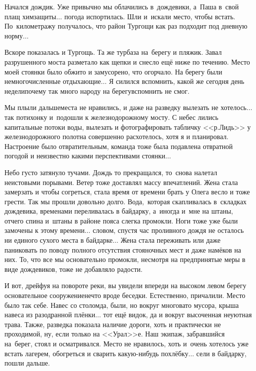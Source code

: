 Начался дождик. Уже привычно мы облачились в~дождевики, а~Паша в~свой плащ химзащиты$\ldots$ погода испортилась. Шли и~искали место, чтобы встать. По~километражу получалось, что район Тургощи как раз подходит под дневную норму$\ldots$

Вскоре показалась и Тургощь. Та же турбаза на~берегу и пляжик. Завал разрушенного моста разметало как щепки и снесло ещё ниже по течению. Место моей стоянки было обжито и замусорено, что огорчало. На берегу были немногочисленные отдыхающие$\ldots$ Я силился вспомнить, какой же сегодня день недели\mdash почему так много народу на берегу\mdash вспомнить не смог. 

Мы плыли дальше\mdash места не нравились, и даже на разведку вылезать не хотелось$\ldots$ так потихонку и~подошли к железнодорожному мосту. С небес лились капитальные потоки воды, вылезать и фотографировать табличку <<р.\thinspace Лидь>> у железнодорожного полотна совершенно расхотелось, хотя я и планировал. Настроение было отвратительным, команда тоже была подавлена отвратной погодой и неизвестно какими перспективами стоянки$\ldots$

Небо густо затянуло тучами. Дождь то прекращался, то~снова налетал неистовыми порывами. Ветер тоже доставлял массу впечатлений. Жена стала замерзать и чтобы согреться, стала время от времени брать у Олега весло и тоже грести. Так мы прошли довольно долго. Вода,~которая скапливалась в~складках дождевика, временами переливалась в байдарку, а~иногда и~мне на штаны, отчего спина и~штаны в районе пояса слегка промокли. Ноги тоже уже были замочены к этому времени$\ldots$ словом, спустя час проливного дождя не осталось ни единого сухого места в байдарке$\ldots$ Жена стала переживать или даже паниковать по поводу полного отсутствия стояночных мест и даже намёков на них. То, что все мы основательно промокли, несмотря на предпринятые меры в виде дождевиков, тоже не добавляло радости.

И вот, дрейфуя на повороте реки, вы увидели впереди на высоком левом берегу основательное сооружение\mdash нечто вроде беседки. Естественно, причалили. Место было так себе. Навес со столом\mdash да, были, но вокруг многовато мусора, крыша навеса из разодранной плёнки$\ldots$ тот ещё видок, да и вокруг высоченная неуютная трава. Также, разведка показала наличие дороги, хоть и практически не проходимой, ну, если только на <<Урал>>\sdash е. Наш экипаж, забравшийся на~берег, стоял и осматривался. Место не нравилось, хоть и~очень хотелось уже встать лагерем, обогреться и сварить какую-нибудь похлёбку$\ldots$ сели в байдарку, пошли дальше.

